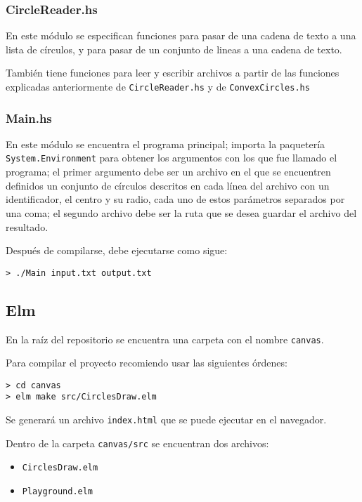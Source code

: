 \documentclass[12pt]{article}
\begin{document}
\subsubsection*{CircleReader.hs}

\noindent En este módulo se especifican funciones para pasar de una cadena de texto a una lista de círculos, y para pasar de un conjunto de lineas a una cadena de texto.

También tiene funciones para leer y escribir archivos a partir de las funciones explicadas anteriormente de \texttt{CircleReader.hs} y de \texttt{ConvexCircles.hs}

\subsubsection*{Main.hs}

\noindent En este módulo se encuentra el programa principal; importa la paquetería \texttt{System.Environment} para obtener los argumentos con los que fue llamado el programa; el primer argumento debe ser un archivo en el que se encuentren definidos un conjunto de círculos descritos en cada línea del archivo con un identificador, el centro y su radio, cada uno de estos parámetros separados por una coma; el segundo archivo debe ser la ruta que se desea guardar el archivo del resultado.

Después de compilarse, debe ejecutarse como sigue:

\begin{verbatim}
> ./Main input.txt output.txt
\end{verbatim}

\subsection*{Elm}

\noindent En la raíz del repositorio se encuentra una carpeta con el nombre \texttt{canvas}.

Para compilar el proyecto recomiendo usar las siguientes órdenes:

\begin{verbatim}
> cd canvas
> elm make src/CirclesDraw.elm
\end{verbatim}

Se generará un archivo \texttt{index.html} que se puede ejecutar en el navegador.

Dentro de la carpeta \texttt{canvas/src} se encuentran dos archivos:

\begin{itemize}
\item \texttt{CirclesDraw.elm}
\item \texttt{Playground.elm}
\end{itemize}
\end{document}
